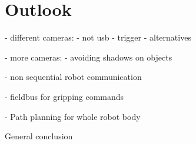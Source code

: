 \chapter{Outlook}
\label{chap:outlook}
- different cameras:	- not usb
						- trigger
						- alternatives
				
- more cameras:			- avoiding shadows on objects

- non sequential robot communication

- fieldbus for gripping commands

- Path planning for whole robot body

General conclusion
